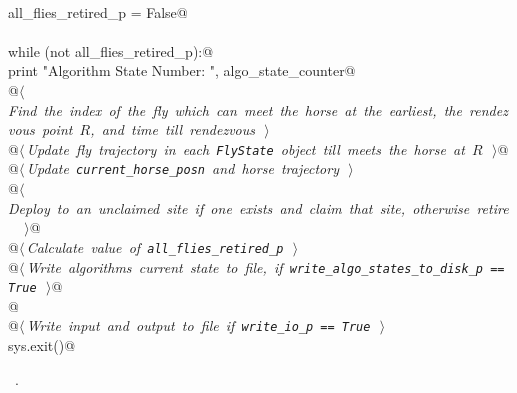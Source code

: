 \documentclass[11.5pt]{report}
\begin{document}
\begin{flushleft}
\begin{list}{}{}
\mbox{}\verb@@\\
\mbox{}\verb@    all_flies_retired_p = False@\\
\mbox{}\verb@@\\
\mbox{}\verb@    while (not all_flies_retired_p):@\\
\mbox{}\verb@       print "Algorithm State Number: ", algo_state_counter@\\
\mbox{}\verb@       @\hbox{$\langle\,${\itshape Find the index of the fly  which can meet the horse at the earliest, the rendezvous point $R$, and time till rendezvous}\nobreak\ {\footnotesize {}}$\,\rangle$}\verb@@\\
\mbox{}\verb@       @\hbox{$\langle\,${\itshape Update fly trajectory in each \verb|FlyState| object till  meets the horse at $R$}\nobreak\ {\footnotesize {}}$\,\rangle$}\verb@ @\\
\mbox{}\verb@       @\hbox{$\langle\,${\itshape Update \verb|current_horse_posn| and horse trajectory}\nobreak\ {\footnotesize {}}$\,\rangle$}\verb@@\\
\mbox{}\verb@       @\hbox{$\langle\,${\itshape Deploy  to an unclaimed site if one exists and claim that site, otherwise retire }\nobreak\ {\footnotesize {}}$\,\rangle$}\verb@ @\\
\mbox{}\verb@       @\hbox{$\langle\,${\itshape Calculate value of \verb|all_flies_retired_p|}\nobreak\ {\footnotesize {}}$\,\rangle$}\verb@@\\
\mbox{}\verb@       @\hbox{$\langle\,${\itshape Write algorithms current state to file, if \verb|write_algo_states_to_disk_p == True|}\nobreak\ {\footnotesize {}}$\,\rangle$}\verb@ @\\
\mbox{}\verb@    @\\
\mbox{}\verb@    @\hbox{$\langle\,${\itshape Write input and output to file if \verb|write_io_p == True|}\nobreak\ {\footnotesize {}}$\,\rangle$}\verb@@\\
\mbox{}\verb@    sys.exit()@\\
\mbox{}\verb@@{\NWsep}
\end{list}
\vspace{-1.5ex}
\footnotesize
\begin{list}{}{\setlength{\itemsep}{-\parsep}\setlength{\itemindent}{-\leftmargin}}
\item \NWtxtMacroRefIn\ .

\item{}
\end{list}
\vspace{4ex}
\end{flushleft}
\end{document}
